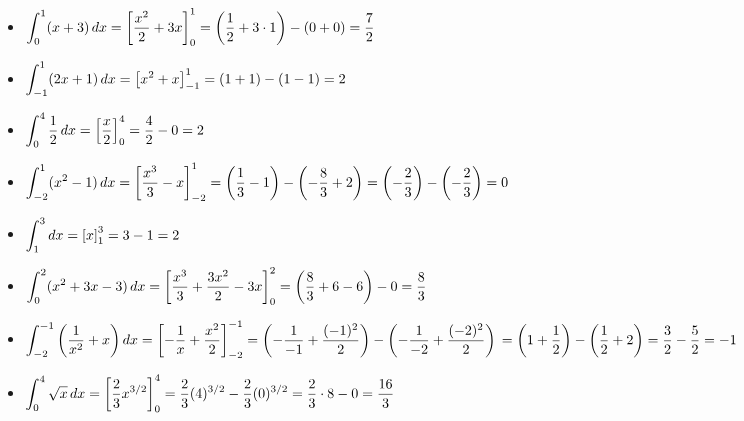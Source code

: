 \documentclass[12pt,openright,twoside,a4paper]{article}
\theoremstyle{definition}
\begin{document}
	\begin{itemize}
		\item[1)] \( \displaystyle \int_{0}^{1} (x + 3) \, dx \\
		= \left[ \dfrac{x^2}{2} + 3x \right]_0^1
		= \left( \dfrac{1}{2} + 3 \cdot 1 \right) - \left( 0 + 0 \right)
		= \dfrac{7}{2} \)
		
		\item[2)] \( \displaystyle \int_{-1}^{1} (2x + 1) \, dx \\
		= \left[ x^2 + x \right]_{-1}^1
		= (1 + 1) - (1 - 1)
		= 2 \)
		
		\item[3)] \( \displaystyle \int_{0}^{4} \dfrac{1}{2} \, dx \\
		= \left[ \dfrac{x}{2} \right]_0^4
		= \dfrac{4}{2} - 0
		= 2 \)
		
		\item[4)] \( \displaystyle \int_{-2}^{1} (x^2 - 1) \, dx \\
		= \left[ \dfrac{x^3}{3} - x \right]_{-2}^1
		= \left( \dfrac{1}{3} - 1 \right) - \left( -\dfrac{8}{3} + 2 \right)
		= \left( -\dfrac{2}{3} \right) - \left( -\dfrac{2}{3} \right)
		= 0 \)
		
		\item[5)] \( \displaystyle \int_{1}^{3} dx \\
		= \left[ x \right]_1^3
		= 3 - 1
		= 2 \)
		
		\item[9)] \( \displaystyle \int_{0}^{2} (x^2 + 3x - 3) \, dx \\
		= \left[ \dfrac{x^3}{3} + \dfrac{3x^2}{2} - 3x \right]_0^2
		= \left( \dfrac{8}{3} + 6 - 6 \right) - 0
		= \dfrac{8}{3} \)
		
		\item[13)] \( \displaystyle \int_{-2}^{-1} \left( \dfrac{1}{x^2} + x \right) dx \\
		= \left[ -\dfrac{1}{x} + \dfrac{x^2}{2} \right]_{-2}^{-1}
		= \left( -\dfrac{1}{-1} + \dfrac{(-1)^2}{2} \right) - \left( -\dfrac{1}{-2} + \dfrac{(-2)^2}{2} \right) \\
		= \left( 1 + \dfrac{1}{2} \right) - \left( \dfrac{1}{2} + 2 \right)
		= \dfrac{3}{2} - \dfrac{5}{2}
		= -1 \)
		
		\item[14)] \( \displaystyle \int_{0}^{4} \sqrt{x} \, dx \\
		= \left[ \dfrac{2}{3}x^{3/2} \right]_0^4
		= \dfrac{2}{3}(4)^{3/2} - \dfrac{2}{3}(0)^{3/2} \\
		= \dfrac{2}{3} \cdot 8 - 0
		= \dfrac{16}{3} \) 
	\end{itemize}
	
\end{document}
